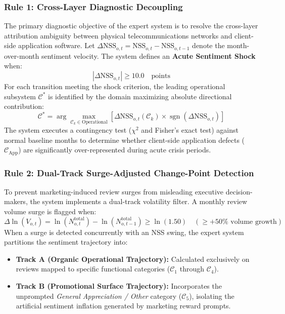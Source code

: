 \documentclass[5p,twocolumn,authoryear]{elsarticle}
\begin{document}
\subsubsection{Rule 1: Cross-Layer Diagnostic Decoupling}
The primary diagnostic objective of the expert system is to resolve the cross-layer attribution ambiguity between physical telecommunications networks and client-side application software. Let $\Delta \text{NSS}_{o,t} = \text{NSS}_{o,t} - \text{NSS}_{o,t-1}$ denote the month-over-month sentiment velocity. The system defines an \textbf{Acute Sentiment Shock} when:
\begin{equation}
\label{eq:shock_threshold}
|\Delta \text{NSS}_{o,t}| \ge 10.0 \quad \text{points}
\end{equation}
For each transition meeting the shock criterion, the leading operational subsystem $\mathcal{C}^*$ is identified by the domain maximizing absolute directional contribution:
\begin{equation}
\mathcal{C}^* = \arg\max_{\mathcal{C}_k \in \text{Operational}} \left[ \Delta \text{NSS}_{o,t}(\mathcal{C}_k) \times \operatorname{sgn}(\Delta \text{NSS}_{o,t}) \right]
\end{equation}
The system executes a contingency test ($\chi^2$ and Fisher's exact test) against normal baseline months to determine whether client-side application defects ($\mathcal{C}_{\text{App}}$) are significantly over-represented during acute crisis periods.

\subsubsection{Rule 2: Dual-Track Surge-Adjusted Change-Point Detection}
To prevent marketing-induced review surges from misleading executive decision-makers, the system implements a dual-track volatility filter. A monthly review volume surge is flagged when:
\begin{equation}
\Delta \ln(V_{o,t}) = \ln(N_{o,t}^{\text{total}}) - \ln(N_{o,t-1}^{\text{total}}) \ge \ln(1.50) \quad (\ge +50\% \text{ volume growth})
\end{equation}
When a surge is detected concurrently with an NSS swing, the expert system partitions the sentiment trajectory into:
\begin{itemize}
    \item \textbf{Track A (Organic Operational Trajectory):} Calculated exclusively on reviews mapped to specific functional categories ($\mathcal{C}_1$ through $\mathcal{C}_4$).
    \item \textbf{Track B (Promotional Surface Trajectory):} Incorporates the unprompted \textit{General Appreciation / Other} category ($\mathcal{C}_5$), isolating the artificial sentiment inflation generated by marketing reward prompts.
\end{itemize}
\end{document}
